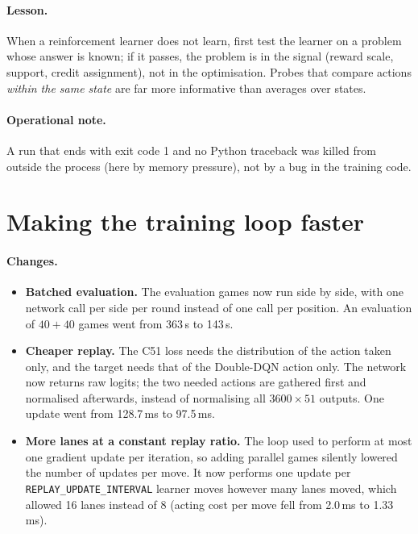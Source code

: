 \paragraph{Lesson.} When a reinforcement learner does not learn, first test the learner on a
problem whose answer is known; if it passes, the problem is in the signal (reward scale, support,
credit assignment), not in the optimisation. Probes that compare actions \emph{within the same
state} are far more informative than averages over states.

\paragraph{Operational note.} A run that ends with exit code 1 and no Python traceback was
killed from outside the process (here by memory pressure), not by a bug in the training code.

\section{Making the training loop faster}

\paragraph{Changes.}
\begin{itemize}
  \item \textbf{Batched evaluation.} The evaluation games now run side by side, with one network
        call per side per round instead of one call per position. An evaluation of
        $40 + 40$ games went from 363\,s to 143\,s.
  \item \textbf{Cheaper replay.} The C51 loss needs the distribution of the action taken only,
        and the target needs that of the Double-DQN action only. The network now returns raw
        logits; the two needed actions are gathered first and normalised afterwards, instead of
        normalising all $3600 \times 51$ outputs. One update went from 128.7\,ms to 97.5\,ms.
  \item \textbf{More lanes at a constant replay ratio.} The loop used to perform at most one
        gradient update per iteration, so adding parallel games silently lowered the number of
        updates per move. It now performs one update per \texttt{REPLAY\_UPDATE\_INTERVAL}
        learner moves however many lanes moved, which allowed 16 lanes instead of 8 (acting cost
        per move fell from 2.0\,ms to 1.33\,ms).
\end{itemize}

